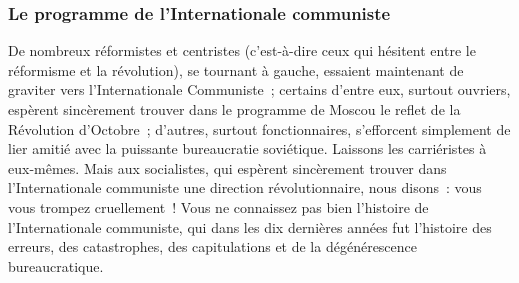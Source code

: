 \documentclass[french,twoside]{book} %
\begin{document}
\subsubsection[{Le programme de l’Internationale communiste}]{Le programme de l’Internationale communiste}
\noindent De nombreux réformistes et centristes (c’est-à-dire ceux qui hésitent entre le réformisme et la révolution), se tournant  à gauche, essaient maintenant de graviter vers l’Internationale Communiste ; certains d’entre eux, surtout ouvriers, espèrent sincèrement trouver dans le programme de Moscou le reflet de la Révolution d’Octobre ; d’autres, surtout fonctionnaires, s’efforcent simplement de lier amitié avec la puissante bureaucratie soviétique. Laissons les carriéristes à eux-mêmes. Mais aux socialistes, qui espèrent sincèrement trouver dans l’Internationale communiste une direction révolutionnaire, nous disons : vous vous trompez cruellement ! Vous ne connaissez pas bien l’histoire de l’Internationale communiste, qui dans les dix dernières années fut l’histoire des erreurs, des catastrophes, des capitulations et de la dégénérescence bureaucratique.\par
\end{document}
